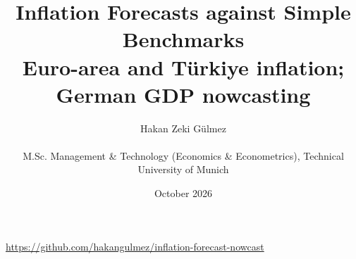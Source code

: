 
\title{Inflation Forecasts against Simple Benchmarks\\\large Euro-area and Türkiye inflation; German GDP nowcasting}
\author{Hakan Zeki Gülmez\\[0.4em]\parbox{0.94\textwidth}{\centering\small M.Sc. Management \& Technology (Economics \& Econometrics), Technical University of Munich}}
\date{October 2026}

\maketitle
\begin{center}\small\url{https://github.com/hakangulmez/inflation-forecast-nowcast}\end{center}


